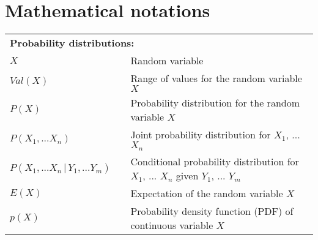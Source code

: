 
\chapter*{Mathematical notations}
\thispagestyle{empty}

\begin{longtable}{lp{5mm}p{11cm}}
\multicolumn{3}{l}{\textbf{Probability distributions:}} \vspace{2mm} \\
$X$ && Random variable \\
$Val(X)$ && Range of values for the random variable $X$ \\
$P(X)$ && Probability distribution for the random variable $X$ \\
$P(X_1, ...X_n)$ && Joint probability distribution for $X_1$, ... $X_n$ \\
$P(X_1,...X_n \, | \, Y_1, ... Y_m)$ && Conditional probability distribution for $X_1$, ... $X_n$ given $Y_1$, ... $Y_m$  \\ 
$E(X)$ && Expectation of the random variable $X$ \\
$p(X)$ && Probability density function (PDF) of continuous variable $X$ \\


\end{longtable}
